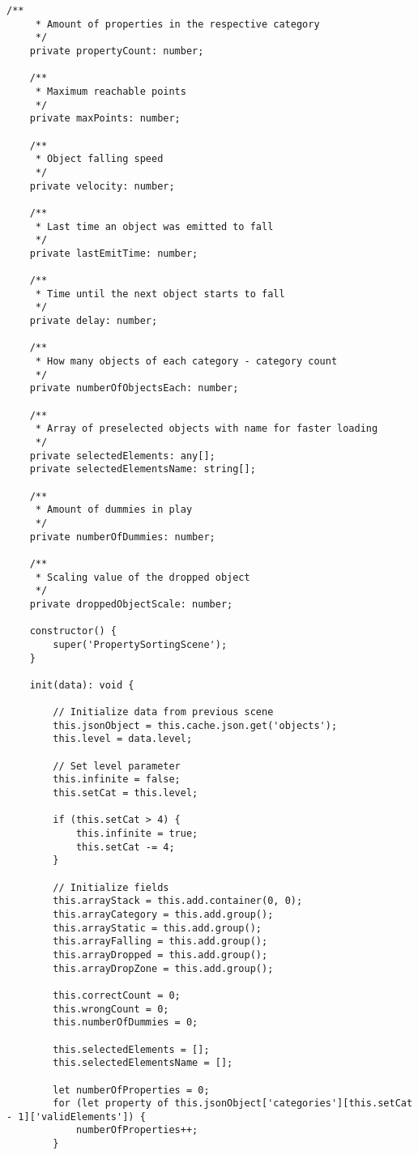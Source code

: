 \begin{lstlisting}[style=TypeScript, caption={propertySortingScene.ts}]
    /**
     * Amount of properties in the respective category
     */
    private propertyCount: number;

    /**
     * Maximum reachable points
     */
    private maxPoints: number;

    /**
     * Object falling speed
     */
    private velocity: number;

    /**
     * Last time an object was emitted to fall
     */
    private lastEmitTime: number;

    /**
     * Time until the next object starts to fall
     */
    private delay: number;

    /**
     * How many objects of each category - category count
     */
    private numberOfObjectsEach: number;

    /**
     * Array of preselected objects with name for faster loading
     */
    private selectedElements: any[];
    private selectedElementsName: string[];

    /**
     * Amount of dummies in play
     */
    private numberOfDummies: number;

    /**
     * Scaling value of the dropped object
     */
    private droppedObjectScale: number;

    constructor() {
        super('PropertySortingScene');
    }

    init(data): void {

        // Initialize data from previous scene
        this.jsonObject = this.cache.json.get('objects');
        this.level = data.level;

        // Set level parameter
        this.infinite = false;
        this.setCat = this.level;

        if (this.setCat > 4) {
            this.infinite = true;
            this.setCat -= 4;
        }

        // Initialize fields
        this.arrayStack = this.add.container(0, 0);
        this.arrayCategory = this.add.group();
        this.arrayStatic = this.add.group();
        this.arrayFalling = this.add.group();
        this.arrayDropped = this.add.group();
        this.arrayDropZone = this.add.group();

        this.correctCount = 0;
        this.wrongCount = 0;
        this.numberOfDummies = 0;

        this.selectedElements = [];
        this.selectedElementsName = [];

        let numberOfProperties = 0;
        for (let property of this.jsonObject['categories'][this.setCat - 1]['validElements']) {
            numberOfProperties++;
        }


\end{lstlisting}
